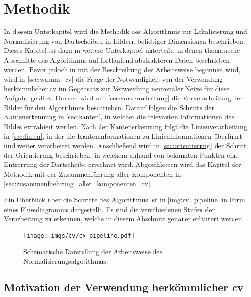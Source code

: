 
\section{Methodik}
\label{sec:cv:methodik}

In diesem Unterkapitel wird die Methodik des Algorithmus zur Lokalisierung und Normalisierung von Dartscheiben in Bildern beliebiger Dimensionen beschrieben. Dieses Kapitel ist dazu in weitere Unterkapitel unterteilt, in denen thematische Abschnitte des Algorithmus auf fortlaufend abstrakteren Daten beschrieben werden. Bevor jedoch in mit der Beschreibung der Arbeitsweise begonnen wird, wird in \autoref{sec:warum_cv} die Frage der Notwendigkeit von der Verwendung herkömmlicher \ac{cv} im Gegensatz zur Verwendung neuronaler Netze für diese Aufgabe geklärt. Danach wird mit \autoref{sec:vorverarbeitung} die Vorverarbeitung der Bilder für den Algorithmus beschrieben. Darauf folgen die Schritte der Kantenerkennung in \autoref{sec:kanten}, in welcher die relevanten Informationen des Bildes extrahiert werden. Nach der Kantenerkennung folgt die Linienverarbeitung in \autoref{sec:linien}, in der die Kanteninformationen zu Linieninformationen überführt und weiter verarbeitet werden. Anschließend wird in \autoref{sec:orientierung} der Schritt der Orientierung beschrieben, in welchem anhand von bekannten Punkten eine Entzerrung der Dartscheibe errechnet wird. Abgeschlossen wird das Kapitel der Methodik mit der Zusammenführung aller Komponenten in \autoref{sec:zusammenfuehrung_aller_komponenten_cv}.

Ein Überblick über die Schritte des Algorithmus ist in \autoref{img:cv_pipeline} in Form eines Flussdiagramms dargestellt. Es sind die verschiedenen Stufen der Verarbeitung zu erkennen, welche in diesem Abschnitt genauer erläutert werden.

\begin{figure}
    \centering
    \texttt{[image: imgs/cv/cv\_pipeline.pdf]}
    \caption{Schematische Darstellung der Arbeitsweise des Normalisierungsalgorithmus.}
    \label{img:cv_pipeline}
\end{figure}



\subsection{Motivation der Verwendung herkömmlicher \acl{cv}}
\label{sec:warum_cv}

